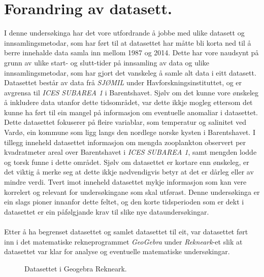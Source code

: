\documentclass{report}
\begin{document}
\section{Forandring av datasett.}
I denne undersøkinga har det vore utfordrande å jobbe med ulike datasett og innsamlingsmetodar, som har ført til at datasettet har måtte bli korta ned til å berre innehalde data samla inn mellom 1987 og 2014. Dette har vore naudsynt på grunn av ulike start- og slutt-tider på innsamling av data og ulike innsamlingsmetodar, som har gjort det vanskeleg å samle alt data i eitt datasett. Datasettet består av data frå \textit{SJØMIL} under Havforskningsinstituttet, og er avgrensa til \textit{ICES SUBAREA 1} i Barentshavet. Sjølv om det kunne vore ønskeleg å inkludere data utanfor dette tidsområdet, var dette ikkje mogleg ettersom det kunne ha ført til ein mangel på informasjon om eventuelle anomaliar i datasettet.
Dette datasettet fokuserer på fleire variablar, som temperatur og salinitet ved Vardø, ein kommune som ligg langs den nordlege norske kysten i Barentshavet. I tillegg inneheld datasettet informasjon om mengda zooplankton observert per kvadratmeter areal over Barentshavet i \textit{ICES SUBAREA 1}, samt mengden lodde og torsk funne i dette området.
Sjølv om datasettet er kortare enn ønskeleg, er det viktig å merke seg at dette ikkje nødvendigvis betyr at det er dårleg eller av mindre verdi. Tvert imot inneheld datasettet mykje informasjon som kan vere korrelert og relevant for undersøkingane som skal utførast. Denne undersøkinga er ein slags pioner innanfor dette feltet, og den korte tidsperioden som er dekt i datasettet er ein påfølgjande krav til slike nye dataundersøkingar. \\
\\
Etter å ha begrenset datasettet og samlet datasettet til eit, var datasettet ført inn i det matematiske rekneprogrammet \textit{GeoGebra} under \textit{Rekneark}-et slik at datasettet var klar for analyse og eventuelle matematiske undersøkingar.
\begin{figure}[H]
	\centering
	\caption{Datasettet i Geogebra Rekneark.}
	\label{F2}
\end{figure}\newpage
\end{document}
